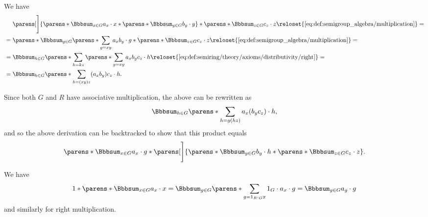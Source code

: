 \begin{defproof}
   We have
  \begin{align*}
    &\phantom{{}={}}
    \parens[\Bigg]{ \parens*{ \Bbbsum_{x \in G} a_x \cdot x } \ast \parens*{ \Bbbsum_{y \in G} b_y \cdot y } } \ast \parens*{ \Bbbsum_{z \in G} c_z \cdot z }
    \reloset {\eqref{eq:def:semigroup_algebra/multiplication}} = \\ &=
    \parens*{ \Bbbsum_{g \in G} \parens*{ \sum_{g = xy} a_x b_y } \cdot g } \ast \parens*{ \Bbbsum_{z \in G} c_z \cdot z }
    \reloset {\eqref{eq:def:semigroup_algebra/multiplication}} = \\ &=
    \Bbbsum_{h \in G} \parens*{ \sum_{h = kz} \parens*{ \sum_{g = xy} a_x b_y } c_z } \cdot h
    \reloset {\eqref{eq:def:semiring/theory/axioms/distributivity/right}} = \\ &=
    \Bbbsum_{h \in G} \parens*{ \sum_{h = (xy)z} (a_x b_y) c_z } \cdot h.
  \end{align*}

  Since both \( G \) and \( R \) have associative multiplication, the above can be rewritten as
  \begin{equation*}
    \Bbbsum_{h \in G} \parens*{ \sum_{h = g(hz)} a_x (b_y c_z) } \cdot h,
  \end{equation*}
  and so the above derivation can be backtracked to show that this product equals
  \begin{equation*}
    \parens*{ \Bbbsum_{x \in G} a_x \cdot g } \ast \parens[\Bigg]{ \parens*{ \Bbbsum_{y \in G} b_y \cdot h } \ast \parens*{ \Bbbsum_{z \in G} c_z \cdot z } }.
  \end{equation*}

   We have
  \begin{equation*}
    1 \ast \parens*{ \Bbbsum_{x \in G} a_x \cdot x }
    =
    \Bbbsum_{g \in G} \parens*{ \sum_{g = 1_R \cdot_G x} 1_G \cdot a_x } \cdot g
    =
    \Bbbsum_{g \in G} a_g \cdot g
  \end{equation*}
  and similarly for right multiplication.
\end{defproof}

